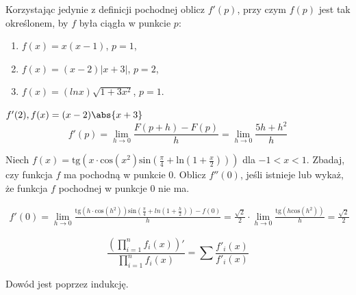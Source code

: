 \documentclass[11pt]{scrartcl}
\begin{document}
  
  \begin{zadanie}
      Korzystając jedynie z definicji pochodnej oblicz $f'(p)$, przy czym $f(p)$ jest tak określonem, by $f$ była ciągła w punkcie $p$:
      \begin{enumerate}
          \item $f(x) = x(x - 1)$, $p = 1$,
          \item $f(x) = (x - 2) \lvert x+3 \rvert$, $p=2$,
          \item $f(x) = \left ( ln x \right ) \sqrt{1+ 3x^2}$, $p=1$.
      \end{enumerate}
  \end{zadanie}

  \begin{walk}
      \item 
      \item $f'(2), f(x) = (x-2) \abs{x + 3}$
        \[
          f'(p) = \lim_{h \to 0} \frac{F(p+ h) - F(p)}{h} = \lim_{h \to 0} \frac{5h + h^2}{h}
        \]
        
  \end{walk}
  
  \begin{zadanie}
    Niech $f(x) = \text{tg} \left ( x \cdot \text{cos} \left ( x^2 \right ) \text{sin} \left ( \frac{\pi}{4} + \text{ln} \left ( 1 + \frac{x}{2} \right ) \right )  \right ) $ dla $-1  < x < 1$. Zbadaj, czy funkcja $f$ ma pochodną w punkcie 0. Oblicz $f''(0)$, jeśli istnieje lub wykaż, że funkcja $f$ pochodnej w punkcje 0 nie ma.
  \end{zadanie}
  
   \begin{gather*}
     f'(0) = \lim_{h \to 0} \frac{\text{tg} \left ( h \cdot \text{cos} \left ( h^2  \right )  \right ) \text{sin} \left ( \frac{\pi}{4} + ln \left ( 1 + \frac{h}{2} \right ) \right ) - f(0)}{h} = \frac{\sqrt{2}}{2} \cdot \lim_{h \to 0} \frac{\text{tg} \left ( h \text{cos} \left ( h^2 \right )  \right ) }{h} = \frac{\sqrt{2}}{2}
   \end{gather*}
   \begin{zadanie}
       \[
         \frac{\left (  \prod_{i = 1}^{n} f_i(x) \right )' }{\prod_{i =1}^{n} f_i(x)} = \sum \frac{f'_i (x)}{f'_i(x)}
       \]
       
   \end{zadanie}
   
   Dowód jest poprzez indukcję.
\end{document}
